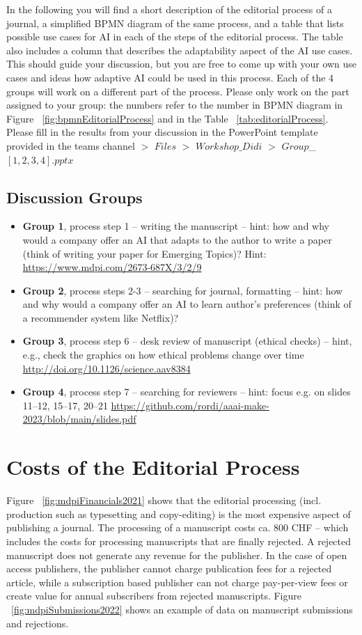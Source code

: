 \documentclass{article}
\begin{document}
In the following you will find a short description of the editorial process of a journal, a simplified BPMN diagram of the same 
process, and a table that lists possible use cases for AI in each of the steps of the editorial process. The table also includes
a column that describes the adaptability aspect of the AI use cases. This should guide your discussion, but you are free to
come up with your own use cases and ideas how adaptive AI could be used in this process. Each of the 4 groups will work on a
different part of the process. Please only work on the part assigned to your group: the numbers refer to the number in BPMN diagram
in Figure ~\ref{fig:bpmnEditorialProcess} and in the Table ~\ref{tab:editorialProcess}. Please fill in the results from your
discussion in the PowerPoint template provided in the teams channel $>$ $Files$ $>$ $Workshop\_Didi$ $>$ $Group$\_$[1,2,3,4].pptx$

\subsection*{Discussion Groups}

\begin{itemize}
    \item \textbf{Group 1}, process step 1 -- writing the manuscript -- hint: how and why would a company offer an AI that adapts to the author to write a paper (think of writing your paper for Emerging Topics)? Hint: \url{https://www.mdpi.com/2673-687X/3/2/9}
    \item \textbf{Group 2}, process steps 2-3 -- searching for journal, formatting -- hint: how and why would a company offer an AI to learn author's preferences (think of a recommender system like Netflix)?
    \item \textbf{Group 3}, process step 6 -- desk review of manuscript (ethical checks) -- hint, e.g., check the graphics on how ethical problems change over time \url{http://doi.org/10.1126/science.aav8384}
    \item \textbf{Group 4}, process step 7 -- searching for reviewers -- hint: focus e.g. on slides 11--12, 15--17, 20--21 \url{https://github.com/rordi/aaai-make-2023/blob/main/slides.pdf}
\end{itemize}


\section{Costs of the Editorial Process}

Figure ~\ref{fig:mdpiFinancials2021} shows that the editorial processing (incl. production such as typesetting and copy-editing) is the most
expensive aspect of publishing a journal. The processing of a manuscript costs ca. 800 CHF -- which includes the costs for processing manuscripts
that are finally rejected. A rejected manuscript does not generate any revenue for the publisher. In the case of open access publishers, the 
publisher cannot charge publication fees for a rejected article, while a subscription based publisher can not charge pay-per-view fees or 
create value for annual subscribers from rejected manuscripts. Figure ~\ref{fig:mdpiSubmissions2022} shows an example of data on manuscript
submissions and rejections.
\end{document}
